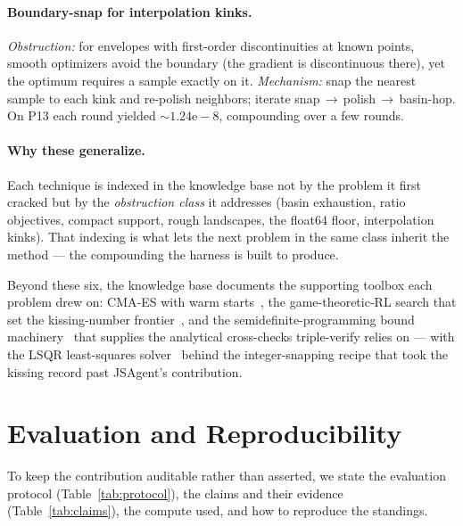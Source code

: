 \documentclass[11pt]{article}
\newcommand{\src}[1]{}
\begin{document}
\paragraph{Boundary-snap for interpolation kinks.}
\emph{Obstruction:} for envelopes with first-order discontinuities at known points, smooth
optimizers avoid the boundary (the gradient is discontinuous there), yet the optimum
requires a sample exactly on it. \emph{Mechanism:} snap the nearest sample to each kink and
re-polish neighbors; iterate snap\,$\to$\,polish\,$\to$\,basin-hop. On P13 each round yielded
$\sim 1.24\mathrm{e}{-}8$, compounding over a few rounds. \src{techniques/boundary-snap-for-kinks.md}

\paragraph{Why these generalize.}
Each technique is indexed in the knowledge base not by the problem it first cracked but by the
\emph{obstruction class} it addresses (basin exhaustion, ratio objectives, compact support,
rough landscapes, the float64 floor, interpolation kinks). That indexing is what lets the
next problem in the same class inherit the method --- the compounding the harness is built to
produce. \src{knowledge/wiki/techniques/README.md}

Beyond these six, the knowledge base documents the supporting toolbox each problem drew on:
CMA-ES with warm starts~\cite{hansen2016cmaes,nomura2020warmcmaes}, the
game-theoretic-RL search that set the kissing-number frontier~\cite{ma2025kissinggame}, and
the semidefinite-programming bound machinery~\cite{bachoc2006sdp,mittelmann2009sdpkissing,delaat2024kissingsdp,lasserre2010nonnegativity,razborov2010flag}
that supplies the analytical cross-checks triple-verify relies on --- with the LSQR
least-squares solver~\cite{paige1982lsqr} behind the integer-snapping recipe that took the
kissing record past JSAgent's contribution.

\section{Evaluation and Reproducibility}
\label{sec:eval}

To keep the contribution auditable rather than asserted, we state the evaluation protocol
(Table~\ref{tab:protocol}), the claims and their evidence (Table~\ref{tab:claims}), the compute
used, and how to reproduce the standings.
\end{document}
